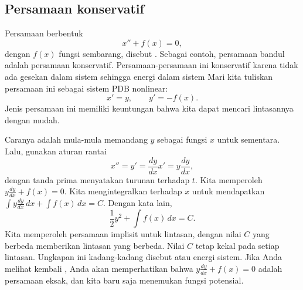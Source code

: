 \subsection{Persamaan konservatif}

Persamaan berbentuk
\begin{equation*}
x'' + f(x) = 0,
\end{equation*}
dengan $f(x)$ fungsi sembarang, disebut
\emph{}. Sebagai contoh, persamaan bandul
adalah persamaan konservatif. Persamaan-persamaan ini konservatif karena tidak ada
gesekan dalam sistem sehingga energi dalam sistem 
Mari kita tuliskan persamaan ini sebagai
sistem PDB nonlinear:
\begin{equation*}
x' = y, \qquad y' = -f(x) .
\end{equation*}
Jenis persamaan ini memiliki
keuntungan bahwa kita dapat mencari lintasannya dengan mudah.

Caranya adalah mula-mula memandang $y$ sebagai fungsi $x$ untuk sementara. Lalu,
gunakan aturan rantai
\begin{equation*}
x'' = y' = \frac{dy}{dx} x' = y \frac{dy}{dx} ,
\end{equation*}
dengan tanda prima menyatakan turunan terhadap $t$.
Kita memperoleh $y \frac{dy}{dx} + f(x) = 0$. Kita mengintegralkan terhadap
$x$ untuk mendapatkan
$\int y \frac{dy}{dx} \,dx + \int f(x)\, dx = C$. Dengan kata lain,
\begin{equation*}
\frac{1}{2} y^2  + \int f(x)\, dx = C .
\end{equation*}
Kita memperoleh persamaan implisit untuk lintasan, dengan nilai $C$ yang berbeda
memberikan lintasan yang berbeda. Nilai
$C$ tetap kekal pada setiap lintasan. Ungkapan ini
kadang-kadang disebut \emph{} atau energi
sistem.
Jika Anda melihat kembali , Anda akan memperhatikan
bahwa $y\frac{dy}{dx} + f(x) = 0$ adalah persamaan eksak, dan
kita baru saja menemukan fungsi potensial.

